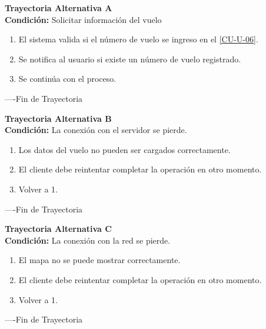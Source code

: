 \begin{flushleft}
	\hypertarget{TrayectoriaA_CU-U-09}{}
	\textbf{Trayectoria Alternativa A}\\
	\textbf{Condición:} Solicitar información del vuelo \\
	\begin{enumerate}
		\item El sistema valida si el número de vuelo se ingreso en el \hyperlink{CU-U-06}{[CU-U-06]}. 
		\item Se notifica al usuario si existe un número de vuelo registrado.
		\item Se continúa con el proceso.
	\end{enumerate}
\end{flushleft}
----Fin de Trayectoria

\begin{flushleft}
	\hypertarget{TrayectoriaB_CU-U-09}{}
	\textbf{Trayectoria Alternativa B}\\
	\textbf{Condición:} La conexión con el servidor se pierde. \\
	\begin{enumerate}
		\item Los datos del vuelo no pueden ser cargados correctamente. 
		\item El cliente debe reintentar completar la operación en otro momento. 
		\item Volver a 1.
	\end{enumerate}
\end{flushleft}
----Fin de Trayectoria

\begin{flushleft}
	\hypertarget{TrayectoriaC_CU-U-09}{}
	\textbf{Trayectoria Alternativa C}\\
	\textbf{Condición:} La conexión con la red se pierde. \\
	\begin{enumerate}
		\item El mapa no se puede mostrar correctamente. 
		\item El cliente debe reintentar completar la operación en otro momento. 
		\item Volver a 1.
	\end{enumerate}
\end{flushleft}
----Fin de Trayectoria
\newpage